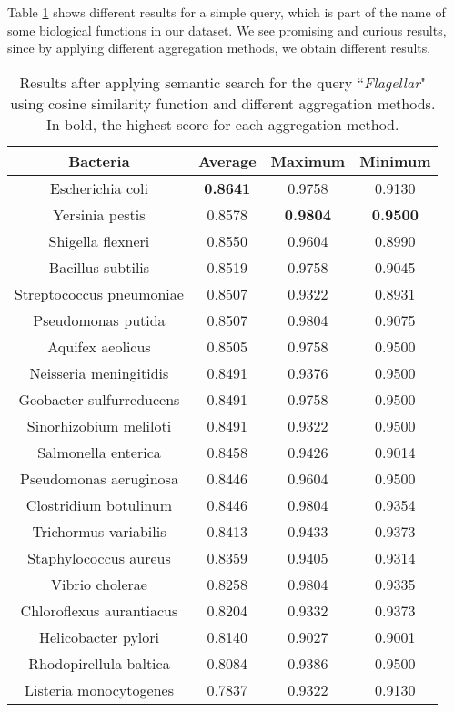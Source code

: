 \documentclass{article}
\begin{document}
Table \ref{tab:semantic_search} shows different results for a simple query, which is part of the name of some biological functions in our dataset. We see promising and curious results, since by applying different aggregation methods, we obtain different results.
\begin{table}[h!]
\centering
\begin{tabular}{|c|ccc|}
\hline
\textbf{Bacteria} & \textbf{Average} & \textbf{Maximum} & \textbf{Minimum} \\
\hline
Escherichia coli & \textbf{0.8641} & 0.9758 & 0.9130 \\
Yersinia pestis & 0.8578 & \textbf{0.9804} & \textbf{0.9500} \\
Shigella flexneri & 0.8550 & 0.9604 & 0.8990 \\
Bacillus subtilis & 0.8519 & 0.9758 & 0.9045 \\
Streptococcus pneumoniae & 0.8507 & 0.9322 & 0.8931 \\
Pseudomonas putida & 0.8507 & 0.9804 & 0.9075 \\
Aquifex aeolicus & 0.8505 & 0.9758 & 0.9500 \\
Neisseria meningitidis & 0.8491 & 0.9376 & 0.9500 \\
Geobacter sulfurreducens & 0.8491 & 0.9758 & 0.9500 \\
Sinorhizobium meliloti & 0.8491 & 0.9322 & 0.9500 \\
Salmonella enterica & 0.8458 & 0.9426 & 0.9014 \\
Pseudomonas aeruginosa & 0.8446 & 0.9604 & 0.9500 \\
Clostridium botulinum & 0.8446 & 0.9804 & 0.9354 \\
Trichormus variabilis & 0.8413 & 0.9433 & 0.9373 \\
Staphylococcus aureus & 0.8359 & 0.9405 & 0.9314 \\
Vibrio cholerae & 0.8258 & 0.9804 & 0.9335 \\
Chloroflexus aurantiacus & 0.8204 & 0.9332 & 0.9373 \\
Helicobacter pylori & 0.8140 & 0.9027 & 0.9001 \\
Rhodopirellula baltica & 0.8084 & 0.9386 & 0.9500 \\
Listeria monocytogenes & 0.7837 & 0.9322 & 0.9130 \\
\hline
\end{tabular}
\caption{Results after applying semantic search for the query ``\textit{Flagellar}" using cosine similarity function and different aggregation methods. In bold, the highest score for each aggregation method.}
\label{tab:semantic_search}
\end{table}
\end{document}
